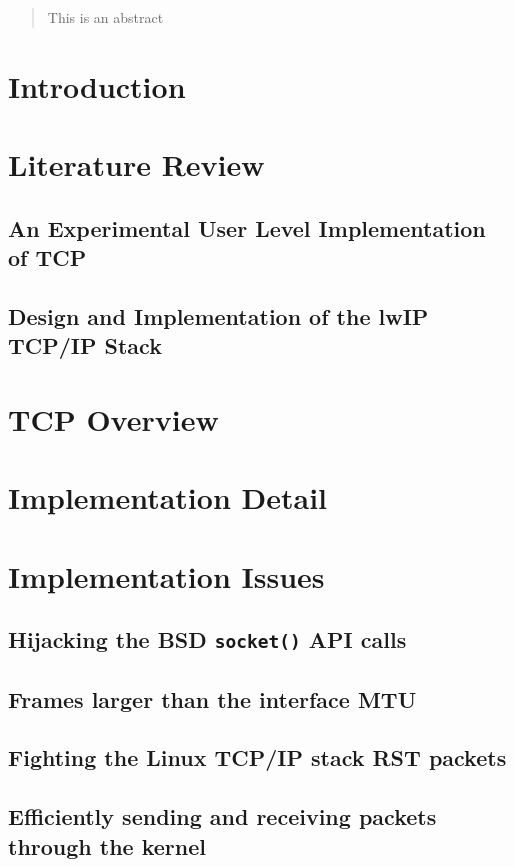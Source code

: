 \documentclass[10pt,a4paper,british]{article}
\begin{document}
\begin{abstract}
This is an abstract
\end{abstract}

\tableofcontents

\section{Introduction}

\section{Literature Review}
\subsection{An Experimental User Level Implementation of TCP~\cite{braun:inria-00074040}}
\subsection{Design and Implementation of the lwIP TCP/IP Stack~\cite{lwip}}

\section{TCP Overview}

\section{Implementation Detail}

\section{Implementation Issues}
\subsection{Hijacking the BSD \texttt{socket()} API calls} %
% 

\subsection{Frames larger than the interface MTU}

\subsection{Fighting the Linux TCP/IP stack RST packets}

\subsection{Efficiently sending and receiving packets through the kernel~\cite{tpacket}}

\printbibliography{}
\end{document}

